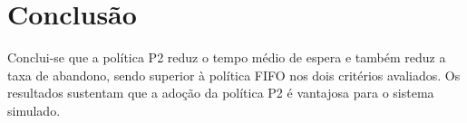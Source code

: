\section{Conclusão}
Conclui-se que a política P2 reduz o tempo médio de espera e também reduz a taxa de abandono, sendo superior à política FIFO nos dois critérios avaliados.
Os resultados sustentam que a adoção da política P2 é vantajosa para o sistema simulado.
